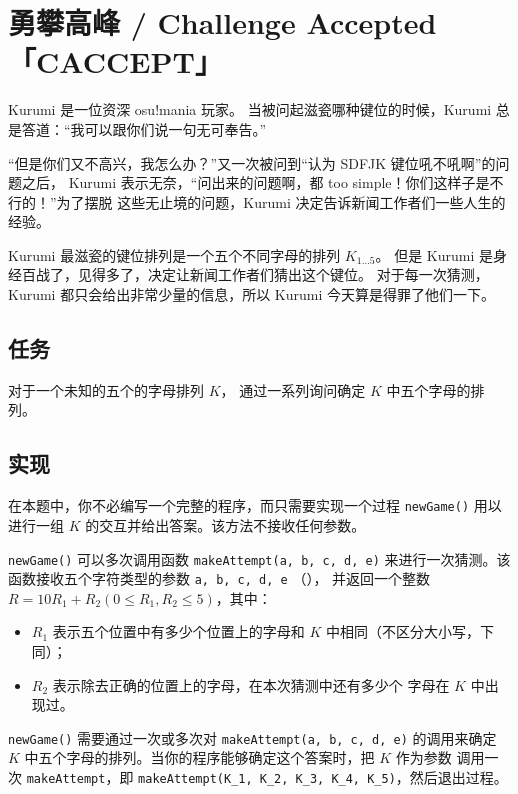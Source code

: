 \documentclass[UTF8, 11pt, a4paper]{article}
\begin{document}
\section*{勇攀高峰 / Challenge Accepted \makebox[2.5em]{} \small{「CACCEPT」}}

Kurumi 是一位资深 osu!mania 玩家。%
当被问起滋瓷哪种键位的时候，Kurumi 总是答道：“我可以跟你们说一句无可奉告。”%

“但是你们又不高兴，我怎么办？”又一次被问到“认为 SDFJK 键位吼不吼啊”的问题之后，%
Kurumi 表示无奈，“问出来的问题啊，都 too simple！你们这样子是不行的！”为了摆脱%
这些无止境的问题，Kurumi 决定告诉新闻工作者们一些人生的经验。

Kurumi 最滋瓷的键位排列是一个五个不同字母的排列 $K_{1 \dots 5}$。%
但是 Kurumi 是身经百战了，见得多了，决定让新闻工作者们猜出这个键位。%
对于每一次猜测，Kurumi 都只会给出非常少量的信息，所以 Kurumi 今天算是得罪了他们一下。

\subsection*{任务}
对于一个未知的五个的字母排列 $K$，%
通过一系列询问确定 $K$ 中五个字母的排列。

\subsection*{实现}
在本题中，你不必编写一个完整的程序，而只需要实现一个过程 \texttt{newGame()}%
用以进行一组 $K$ 的交互并给出答案。该方法不接收任何参数。

\texttt{newGame()} 可以多次调用函数 \texttt{makeAttempt(a, b, c, d, e)}%
来进行一次猜测。该函数接收五个字符类型的参数 \texttt{a, b, c, d, e}%
（），%
并返回一个整数 $R = 10 R_1 + R_2 (0 \leq R_1, R_2 \leq 5)$，其中：
\begin{itemize}
    \item $R_1$ 表示五个位置中有多少个位置上的字母和 $K$ 中相同（不区分大小写，下同）；
    \item $R_2$ 表示除去正确的位置上的字母，在本次猜测中还有多少个%
        字母在 $K$ 中出现过。
\end{itemize}

\texttt{newGame()} 需要通过一次或多次对 \texttt{makeAttempt(a, b, c, d, e)}%
的调用来确定 $K$ 中五个字母的排列。当你的程序能够确定这个答案时，把 $K$ 作为参数%
调用一次 \texttt{makeAttempt}，即 \texttt{makeAttempt(K\_1, K\_2, K\_3, K\_4, K\_5)}，然后退出过程。
\end{document}
